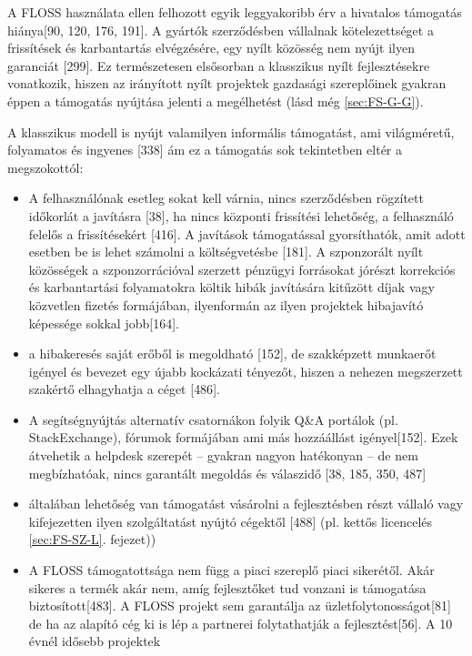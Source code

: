 \documentclass[12pt,magyar,a4paper,oneside]{scrreprt}
\providecommand{\tightlist}{%
  \setlength{\itemsep}{0pt}\setlength{\parskip}{0pt}}
\begin{document}
A FLOSS használata ellen felhozott egyik leggyakoribb érv a hivatalos
támogatás hiánya{[}90, 120, 176, 191{]}. A gyártók szerződésben
vállalnak kötelezettséget a frissítések és karbantartás elvégzésére, egy
nyílt közösség nem nyújt ilyen garanciát {[}299{]}. Ez természetesen
elsősorban a klasszikus nyílt fejlesztésekre vonatkozik, hiszen az
irányított nyílt projektek gazdasági szereplőinek gyakran éppen a
támogatás nyújtása jelenti a megélhetést (lásd még \ref{sec:FS-G-G}).

A klasszikus modell is nyújt valamilyen informális támogatást, ami
világméretű, folyamatos és ingyenes {[}338{]} ám ez a támogatás sok
tekintetben eltér a megszokottól:

\begin{itemize}
\tightlist
\item
  A felhasználónak esetleg sokat kell várnia, nincs szerződésben
  rögzített időkorlát a javításra {[}38{]}, ha nincs központi frissítési
  lehetőség, a felhasználó felelős a frissítésekért {[}416{]}. A
  javítások támogatással gyorsíthatók, amit adott esetben be is lehet
  számolni a költségvetésbe {[}181{]}. A szponzorált nyílt közösségek a
  szponzorrációval szerzett pénzügyi forrásokat jórészt korrekciós és
  karbantartási folyamatokra költik hibák javítására kitűzött díjak vagy
  közvetlen fizetés formájában, ilyenformán az ilyen projektek
  hibajavító képessége sokkal jobb{[}164{]}.
\item
  a hibakeresés saját erőből is megoldható {[}152{]}, de szakképzett
  munkaerőt igényel és bevezet egy újabb kockázati tényezőt, hiszen a
  nehezen megszerzett szakértő elhagyhatja a céget {[}486{]}.
\item
  A segítségnyújtás alternatív csatornákon folyik Q\&A portálok (pl.
  StackExchange), fórumok formájában ami más hozzáállást
  igényel{[}152{]}. Ezek átvehetik a helpdesk szerepét -- gyakran nagyon
  hatékonyan -- de nem megbízhatóak, nincs garantált megoldás és
  válaszidő {[}38, 185, 350, 487{]}
\item
  általában lehetőség van támogatást vásárolni a fejlesztésben részt
  vállaló vagy kifejezetten ilyen szolgáltatást nyújtó cégektől
  {[}488{]} (pl. kettős licencelés \ref{sec:FS-SZ-L}. fejezet))
\item
  A FLOSS támogatottsága nem függ a piaci szereplő piaci sikerétől. Akár
  sikeres a termék akár nem, amíg fejlesztőket tud vonzani is támogatása
  biztosított{[}483{]}. A FLOSS projekt sem garantálja az
  üzletfolytonosságot{[}81{]} de ha az alapító cég ki is lép a partnerei
  folytathatják a fejlesztést{[}56{]}. A 10 évnél idősebb projektek

\end{itemize}
\end{document}
